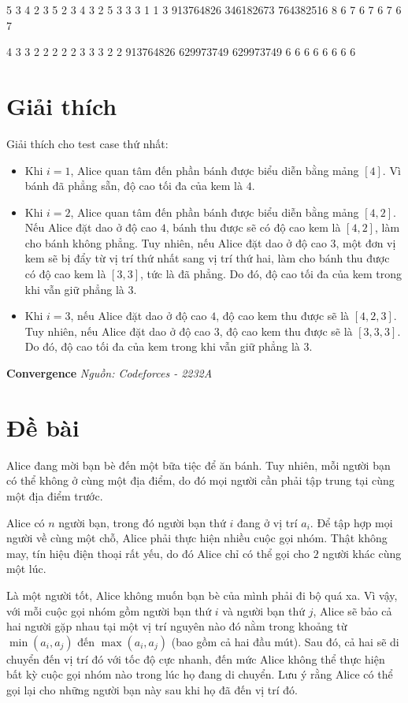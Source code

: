 \documentclass[12pt,a4paper]{article}
\newcommand{\problem}[2]{%
  \addcontentsline{toc}{section}{#1}%
  \begin{mdframed}[
    linecolor=framecolor,
    linewidth=1.5pt,
    backgroundcolor=white,
    topline=true, bottomline=true,
    leftline=true, rightline=true,
    innerleftmargin=10pt, innerrightmargin=10pt,
    innertopmargin=6pt, innerbottommargin=6pt,
  ]
  \textbf{\large #1} \hfill \textit{Nguồn: #2}
  \end{mdframed}
  \vspace{4pt}%
}
\begin{document}
\begin{inputbox}5
3
4 2 3
5
2 3 4 3 2
5
3 3 3 1 1
3
913764826 346182673 764382516
8
6 7 6 7 6 7 6 7
\end{inputbox}\begin{outputbox}4 3 3 
2 2 2 2 2 
3 3 3 2 2 
913764826 629973749 629973749 
6 6 6 6 6 6 6 6 
\end{outputbox}%


\section*{Giải thích}
Giải thích cho test case thứ nhất:
\begin{itemize}
    \item Khi $i = 1$, Alice quan tâm đến phần bánh được biểu diễn bằng mảng $[4]$. Vì bánh đã phẳng sẵn, độ cao tối đa của kem là $4$.
    \item Khi $i = 2$, Alice quan tâm đến phần bánh được biểu diễn bằng mảng $[4, 2]$. Nếu Alice đặt dao ở độ cao $4$, bánh thu được sẽ có độ cao kem là $[4, 2]$, làm cho bánh không phẳng. Tuy nhiên, nếu Alice đặt dao ở độ cao $3$, một đơn vị kem sẽ bị đẩy từ vị trí thứ nhất sang vị trí thứ hai, làm cho bánh thu được có độ cao kem là $[3, 3]$, tức là đã phẳng. Do đó, độ cao tối đa của kem trong khi vẫn giữ phẳng là $3$.
    \item Khi $i = 3$, nếu Alice đặt dao ở độ cao $4$, độ cao kem thu được sẽ là $[4, 2, 3]$. Tuy nhiên, nếu Alice đặt dao ở độ cao $3$, độ cao kem thu được sẽ là $[3, 3, 3]$. Do đó, độ cao tối đa của kem trong khi vẫn giữ phẳng là $3$.
\end{itemize}

\newpage
\problem{Convergence}{Codeforces - 2232A}

\section*{Đề bài}
Alice đang mời bạn bè đến một bữa tiệc để ăn bánh. Tuy nhiên, mỗi người bạn có thể không ở cùng một địa điểm, do đó mọi người cần phải tập trung tại cùng một địa điểm trước.

Alice có $n$ người bạn, trong đó người bạn thứ $i$ đang ở vị trí $a_i$. Để tập hợp mọi người về cùng một chỗ, Alice phải thực hiện nhiều cuộc gọi nhóm. Thật không may, tín hiệu điện thoại rất yếu, do đó Alice chỉ có thể gọi cho $2$ người khác cùng một lúc.

Là một người tốt, Alice không muốn bạn bè của mình phải đi bộ quá xa. Vì vậy, với mỗi cuộc gọi nhóm gồm người bạn thứ $i$ và người bạn thứ $j$, Alice sẽ bảo cả hai người gặp nhau tại một vị trí nguyên nào đó nằm trong khoảng từ $\min(a_i, a_j)$ đến $\max(a_i, a_j)$ (bao gồm cả hai đầu mút). Sau đó, cả hai sẽ di chuyển đến vị trí đó với tốc độ cực nhanh, đến mức Alice không thể thực hiện bất kỳ cuộc gọi nhóm nào trong lúc họ đang di chuyển. Lưu ý rằng Alice có thể gọi lại cho những người bạn này sau khi họ đã đến vị trí đó.
\end{document}
